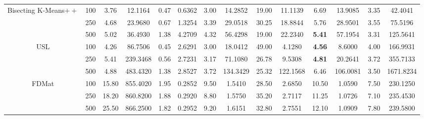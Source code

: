 \documentclass[preprint,12pt]{elsarticle}
\begin{document}
\begin{table}[!t]
{\begin{tabular}{cc|cc|cc|cc|cc|cc|cc}
\multirow{3}{*}{Bisecting K-Means$++$} & 100    & 3.76            & 12.1164           & 0.47            & 0.6362           & 3.00             & 14.2852          & 19.00          & 11.1139          & 6.69            & 13.9085          & 3.35            & 42.4041          \\
                                       & 250    & 4.68            & 23.9680           & 0.67            & 1.3254           & 3.39             & 29.0518          & 30.25          & 18.8844          & 5.76            & 28.9501          & 3.55            & 75.5196          \\
                                       & 500    & 5.02            & 36.4930           & 1.38            & 4.2709           & 4.32             & 56.4298          & 19.00          & 22.2340          & \textbf{5.41}   & 57.1954          & 3.31            & 125.5641         \\ \hline
\multirow{3}{*}{USL}                   & 100    & 4.26            & 86.7506           & 0.45            & 2.6291           & 3.00             & 18.0412          & 49.00          & 4.1280           & \textbf{4.56}   & 8.6000           & 4.00            & 166.9931         \\
                                       & 250    & 5.41            & 239.3468          & 0.56            & 2.7231           & 3.17             & 71.1080          & 26.78          & 9.5308           & \textbf{4.81}   & 20.2641          & 3.72            & 355.7133         \\
                                       & 500    & 4.88            & 483.4320          & 1.38            & 2.8527           & 3.72             & 134.3429         & 25.32          & 122.1568         & 6.46            & 106.0081         & 3.50            & 1671.8234        \\ \hline

 \multirow{3}{*}{FDMat}         &  100    &  15.80           &  855.4020           &  1.95             &  0.2852            &  9.50              &  1.5410            &  28.50            &  2.6850            &  10.50            &  1.0590            &  7.50             &  230.1250          \\
                                       &  250    &  18.20           &  860.8200           &  1.88             &  0.2920            &  8.80              &  1.5750            &  35.20            &  2.7117            &  11.25            &  1.0726            &  7.10             &  235.4530          \\
                                       &  500    &  25.50           &  866.2500           &  1.82             &  0.2952            &  9.20              &  1.6151            &  32.80            &  2.7551            &  12.10            &  1.0909            &  7.80             &  239.5800          \\ \hline


\end{tabular}}
\end{table}
\end{document}
